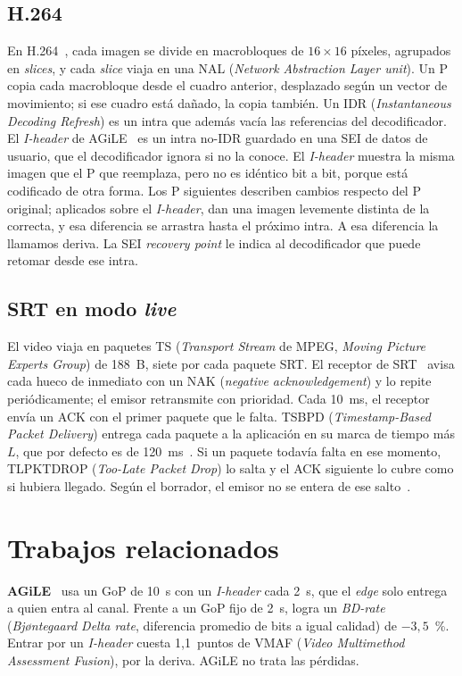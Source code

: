 \documentclass[10pt,twocolumn,letterpaper]{article}
\begin{document}
\subsection{H.264}
En H.264~\cite{h264}, cada imagen se divide en macrobloques de $16\times16$ píxeles, agrupados en \emph{slices}, y cada \emph{slice} viaja en una NAL (\emph{Network Abstraction Layer unit}). Un P copia cada macrobloque desde el cuadro anterior, desplazado según un vector de movimiento; si ese cuadro está dañado, la copia también. Un IDR (\emph{Instantaneous Decoding Refresh}) es un intra que además vacía las referencias del decodificador. El \emph{I-header} de AGiLE~\cite{agile} es un intra no-IDR guardado en una SEI de datos de usuario, que el decodificador ignora si no la conoce. El \emph{I-header} muestra la misma imagen que el P que reemplaza, pero no es idéntico bit a bit, porque está codificado de otra forma. Los P siguientes describen cambios respecto del P original; aplicados sobre el \emph{I-header}, dan una imagen levemente distinta de la correcta, y esa diferencia se arrastra hasta el próximo intra. A esa diferencia la llamamos deriva. La SEI \emph{recovery point} le indica al decodificador que puede retomar desde ese intra.

\subsection{SRT en modo \emph{live}}
El video viaja en paquetes TS (\emph{Transport Stream} de MPEG, \emph{Moving Picture Experts Group}) de 188~B, siete por cada paquete SRT. El receptor de SRT~\cite{srt} avisa cada hueco de inmediato con un NAK (\emph{negative acknowledgement}) y lo repite periódicamente; el emisor retransmite con prioridad. Cada 10~ms, el receptor envía un ACK con el primer paquete que le falta. TSBPD (\emph{Timestamp-Based Packet Delivery}) entrega cada paquete a la aplicación en su marca de tiempo más $L$, que por defecto es de 120~ms~\cite{srt}. Si un paquete todavía falta en ese momento, TLPKTDROP (\emph{Too-Late Packet Drop}) lo salta y el ACK siguiente lo cubre como si hubiera llegado. Según el borrador, el emisor no se entera de ese salto~\cite{srt}.

\section{Trabajos relacionados}
\label{sec:relacionados}

\textbf{AGiLE}~\cite{agile} usa un GoP de 10~s con un \emph{I-header} cada 2~s, que el \emph{edge} solo entrega a quien entra al canal. Frente a un GoP fijo de 2~s, logra un \emph{BD-rate} (\emph{Bjøntegaard Delta rate}, diferencia promedio de bits a igual calidad) de $-3{,}5$~\%. Entrar por un \emph{I-header} cuesta 1,1~puntos de VMAF (\emph{Video Multimethod Assessment Fusion}), por la deriva. AGiLE no trata las pérdidas.
\end{document}
